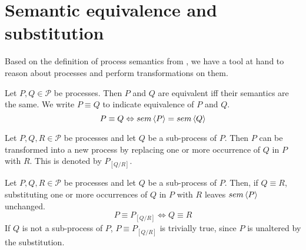 \clearpage
\section{Semantic equivalence and substitution}
\label{chp:semantic_equivalence}
Based on the definition of process semantics from , we have a tool at hand to reason about processes and perform transformations on them.

\begin{definition}
\label{def:process_equivalence}
Let $P, Q \in \mathcal{P}$ be processes. Then $P$ and $Q$ are equivalent iff their semantics are the same. We write $P \equiv Q$ to indicate equivalence of $P$ and $Q$.
  \begin{equation*}
    \label{eqn:equivalence}
    P \equiv Q \Leftrightarrow sem \left\langle P \right\rangle = sem \left\langle Q \right\rangle
  \end{equation*}
  \hfill\qedsymbol
\end{definition}


\begin{definition}
\label{def:process_substitution}
Let $P, Q, R \in \mathcal{P}$ be processes and let $Q$ be a sub-process of $P$. Then $P$ can be transformed into a new process by replacing one or more occurrence of $Q$ in $P$ with $R$. This is denoted by $P_{\left[ Q / R \right]}$.

\hfill\qedsymbol
\end{definition}



\begin{theorem}
\label{thm:process_substitution}
Let $P, Q, R \in \mathcal{P}$ be processes and let $Q$ be a sub-process of $P$. Then, if $Q \equiv R$, substituting one or more occurrences of $Q$ in $P$ with $R$ leaves $sem \left\langle P \right\rangle$ unchanged.
  \begin{equation*}
    P \equiv P_{\left[ Q / R \right]} \Leftrightarrow Q \equiv R
  \end{equation*}
If $Q$ is not a sub-process of $P$, $P \equiv P_{\left[ Q / R \right]}$ is trivially true, since $P$ is unaltered by the substitution.

  \hfill\qedsymbol
\end{theorem}


